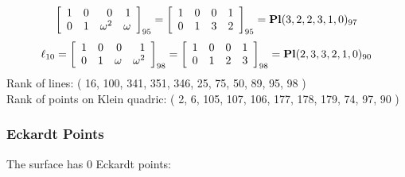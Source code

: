 \documentclass{article}
\begin{document}
{$$\left[
\begin{array}{*{4}{r}}
1 & 0 & 0 & 1\\
0 & 1 & \omega^{2} & \omega \\
\end{array}
\right]
_{95}
=
\left[
\begin{array}{*{4}c}
1  & 0  & 0  & 1\\
0  & 1  & 3  & 2\\
\end{array}
\right]_{95}
={\rm\bf Pl}(3,2,2,3,1,0 )_{97}$$
$$
\ell_{10} = 
\left[
\begin{array}{*{4}{r}}
1 & 0 & 0 & 1\\
0 & 1 & \omega  & \omega^{2}\\
\end{array}
\right]
_{98}
=
\left[
\begin{array}{*{4}c}
1  & 0  & 0  & 1\\
0  & 1  & 2  & 3\\
\end{array}
\right]_{98}
={\rm\bf Pl}(2,3,3,2,1,0 )_{90}$$
Rank of lines: ( 16, 100, 341, 351, 346, 25, 75, 50, 89, 95, 98 )\\
Rank of points on Klein quadric: ( 2, 6, 105, 107, 106, 177, 178, 179, 74, 97, 90 )\\
\subsubsection*{Eckardt Points}
The surface has 0 Eckardt points:\\
}
\end{document}
